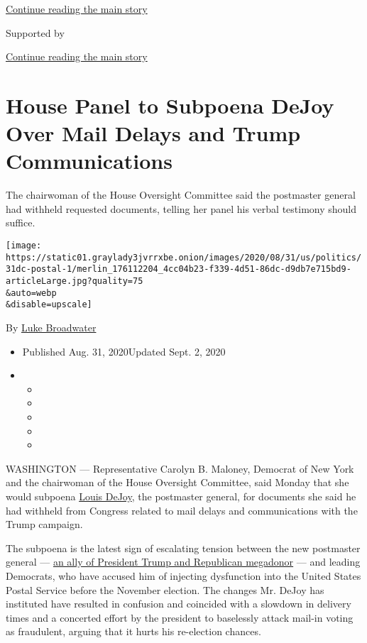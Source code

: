 \protect\hyperlink{after-top}{Continue reading the main story}

Supported by

\protect\hyperlink{after-sponsor}{Continue reading the main story}

\hypertarget{house-panel-to-subpoena-dejoy-over-mail-delays-and-trump-communications}{%
\section{House Panel to Subpoena DeJoy Over Mail Delays and Trump
Communications}\label{house-panel-to-subpoena-dejoy-over-mail-delays-and-trump-communications}}

The chairwoman of the House Oversight Committee said the postmaster
general had withheld requested documents, telling her panel his verbal
testimony should suffice.

\texttt{[image: https://static01.graylady3jvrrxbe.onion/images/2020/08/31/us/politics/31dc-postal-1/merlin\_176112204\_4cc04b23-f339-4d51-86dc-d9db7e715bd9-articleLarge.jpg?quality=75\\\&auto=webp\\\&disable=upscale]}

By \href{https://www.nytimes3xbfgragh.onion/by/luke-broadwater}{Luke
Broadwater}

\begin{itemize}
\item
  Published Aug. 31, 2020Updated Sept. 2, 2020
\item
  \begin{itemize}
  \item
  \item
  \item
  \item
  \item
  \end{itemize}
\end{itemize}

WASHINGTON --- Representative Carolyn B. Maloney, Democrat of New York
and the chairwoman of the House Oversight Committee, said Monday that
she would subpoena
\href{https://www.nytimes3xbfgragh.onion/2020/09/02/us/politics/louis-dejoy-usps-paid.html}{Louis
DeJoy}, the postmaster general, for documents she said he had withheld
from Congress related to mail delays and communications with the Trump
campaign.

The subpoena is the latest sign of escalating tension between the new
postmaster general ---
\href{https://www.nytimes3xbfgragh.onion/article/general-louis-dejoy-postmaster.html}{an
ally of President Trump and Republican megadonor} --- and leading
Democrats, who have accused him of injecting dysfunction into the United
States Postal Service before the November election. The changes Mr.
DeJoy has instituted have resulted in confusion and coincided with a
slowdown in delivery times and a concerted effort by the president to
baselessly attack mail-in voting as fraudulent, arguing that it hurts
his re-election chances.

